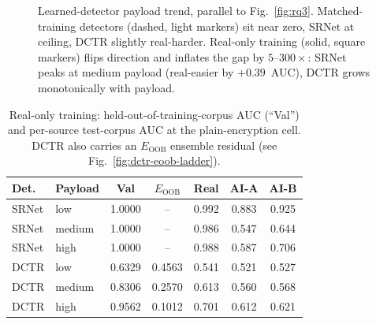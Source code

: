 \documentclass[10pt,twocolumn,a4paper]{article}
\begin{document}
\begin{figure}[!t]
\caption{Learned-detector payload trend, parallel to Fig.~\ref{fig:rq3}. Matched-training detectors (dashed, light markers) sit near zero, SRNet at ceiling, DCTR slightly real-harder. Real-only training (solid, square markers) flips direction and inflates the gap by $5$--$300\times$: SRNet peaks at medium payload (real-easier by $+0.39$~AUC), DCTR grows monotonically with payload.}
\label{fig:learned-payload-trend}
\end{figure}

\begin{table}[!htbp]
\centering\footnotesize
\caption{Real-only training: held-out-of-training-corpus AUC (``Val'') and per-source test-corpus AUC at the plain-encryption cell. DCTR also carries an $E_\text{OOB}$ ensemble residual (see Fig.~\ref{fig:dctr-eoob-ladder}).}
\label{tab:v2a-results}
\setlength{\tabcolsep}{4pt}\renewcommand{\arraystretch}{1.05}
\begin{tabular}{@{}llccccc@{}}
\toprule
\textbf{Det.} & \textbf{Payload} & \textbf{Val} & \textbf{$E_\text{OOB}$} & \textbf{Real} & \textbf{AI-A} & \textbf{AI-B} \\
\midrule
SRNet & low    & 1.0000 & --       & 0.992 & 0.883 & 0.925 \\
SRNet & medium & 1.0000 & --       & 0.986 & 0.547 & 0.644 \\
SRNet & high   & 1.0000 & --       & 0.988 & 0.587 & 0.706 \\
DCTR  & low    & 0.6329 & 0.4563   & 0.541 & 0.521 & 0.527 \\
DCTR  & medium & 0.8306 & 0.2570   & 0.613 & 0.560 & 0.568 \\
DCTR  & high   & 0.9562 & 0.1012   & 0.701 & 0.612 & 0.621 \\
\bottomrule
\end{tabular}
\end{table}
\end{document}
